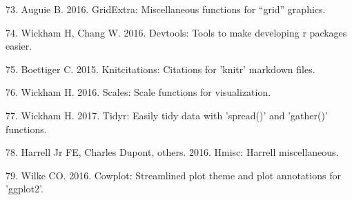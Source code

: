 \documentclass[12pt,]{article}
\begin{document}
\hypertarget{ref-gridExtra}{}
73. Auguie B. 2016. GridExtra: Miscellaneous functions for ``grid''
graphics.

\hypertarget{ref-devtools}{}
74. Wickham H, Chang W. 2016. Devtools: Tools to make developing r
packages easier.

\hypertarget{ref-knitcitations}{}
75. Boettiger C. 2015. Knitcitations: Citations for 'knitr' markdown
files.

\hypertarget{ref-scales}{}
76. Wickham H. 2016. Scales: Scale functions for visualization.

\hypertarget{ref-tidyr}{}
77. Wickham H. 2017. Tidyr: Easily tidy data with 'spread()' and
'gather()' functions.

\hypertarget{ref-Hmisc}{}
78. Harrell Jr FE, Charles Dupont, others. 2016. Hmisc: Harrell
miscellaneous.

\hypertarget{ref-cowplot}{}
79. Wilke CO. 2016. Cowplot: Streamlined plot theme and plot annotations
for 'ggplot2'.
\end{document}
